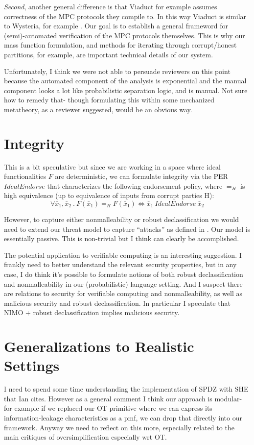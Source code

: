\documentclass[acmsmall,screen,review]{acmart}
\begin{document}
\emph{Second}, another general difference is that Viaduct for example
assumes correctness of the MPC protocols they compile to. In this way
Viaduct is similar to Wysteria, for example
\cite{rastogi2014wysteria}. Our goal is to establish a general
frameword for (semi)-automated verification of the MPC protocols
themselves.  This is why our mass function formulation, and methods
for iterating through corrupt/honest partitions, for example, are
important technical details of our system.

Unfortunately, I think we were not able to persuade reviewers on this
point because the automated component of the analysis is exponential
and the manual component looks a lot like probabilistic separation
logic, and is manual. Not sure how to remedy that- though formulating
this within some mechanized metatheory, as a reviewer suggested, would
be an obvious way.

\section{Integrity}

This is a bit speculative but since we are working in a space where
ideal functionalities $F$ are deterministic, we can formulate
integrity via the PER $\mathit{IdealEndorse}$ that characterizes the
following endorsement policy, where $=_H$ is high equivalence (up to
equivalence of inputs from corrupt parties H):
$$
\forall \bar{x}_1,\bar{x}_2\ .\ F(\bar{x}_1) =_H F(\bar{x}_1) \iff \bar{x}_1
\ \mathit{IdealEndorse}\ \bar{x}_2  
$$

However, to capture either nonmalleability or robust declassification
we would need to extend our threat model to capture ``attacks'' as
defined in \cite{930133}. Our model is essentially passive. This is
non-trivial but I think can clearly be accomplished.

The potential application to verifiable computing is an interesting
suggestion.  I frankly need to better understand the relevant security
properties, but in any case, I do think it's possible to formulate notions
of both robust declassification and nonmalleability in our
(probabilistic) language setting. And I suspect there are relations to
security for verifiable computing and nonmalleability, as well as
malicious security and robust declassification. In particular I
speculate that NIMO + robust declassification implies malicious
security.

\section{Generalizations to Realistic Settings}

I need to spend some time understanding the implementation of SPDZ
with SHE that Ian cites. However as a general comment I think our
approach is modular- for example if we replaced our OT primitive where
we can express its information-leakage characteristics as a pmf, we
can drop that directly into our framework. Anyway we need to reflect
on this more, especially related to the main critiques of
oversimplification especially wrt OT.



%

\end{document}
